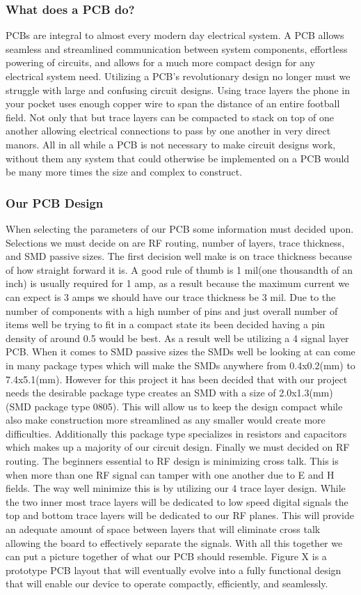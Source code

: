 \subsubsection{What does a PCB do?}
PCBs are integral to almost every modern day electrical system. A PCB allows seamless and streamlined communication between system components, effortless powering of circuits, and allows for a much more compact design for any electrical system need. Utilizing a PCB's revolutionary design no longer must we struggle with large and confusing circuit designs. Using trace layers the phone in your pocket uses enough copper wire to span the distance of an entire football field. Not only that but trace layers can be compacted to stack on top of one another allowing electrical connections to pass by one another in very direct manors. All in all while a PCB is not necessary to make circuit designs work, without them any system that could otherwise be implemented on a PCB would be many more times the size and complex to construct.
\subsubsection{Our PCB Design}
When selecting the parameters of our PCB some information must decided upon. Selections we must decide on are RF routing, number of layers, trace thickness, and SMD passive sizes. The first decision well make is on trace thickness because of how straight forward it is. A good rule of thumb is 1 mil(one thousandth of an inch) is usually required for 1 amp, as a result because the maximum current we can expect is 3 amps we should have our trace thickness be 3 mil. Due to the number of components with a high number of pins and just overall number of items well be trying to fit in a compact state its been decided having a pin density of around 0.5 would be best. As a result well be utilizing a 4 signal layer PCB. When it comes to SMD passive sizes the SMDs well be looking at can come in many package types which will make the SMDs anywhere from 0.4x0.2(mm) to 7.4x5.1(mm). However for this project it has been decided that with our project needs the desirable package type creates an SMD with a size of 2.0x1.3(mm)(SMD package type 0805). This will allow us to keep the design compact while also make construction more streamlined as any smaller would create more difficulties. Additionally this package type specializes in resistors and capacitors which makes up a majority of our circuit design. Finally we must decided on RF routing. The beginners essential to RF design is minimizing cross talk. This is when more than one RF signal can tamper with one another due to E and H fields. The way well minimize this is by utilizing our 4 trace layer design. While the two inner most trace layers will be dedicated to low speed digital signals the top and bottom trace layers will be dedicated to our RF planes. This will provide an adequate amount of space between layers that will eliminate cross talk allowing the board to effectively separate the signals. With all this together we can put a picture together of what our PCB should resemble. Figure X is a prototype PCB layout that will eventually evolve into a fully functional design that will enable our device to operate compactly, efficiently, and seamlessly.